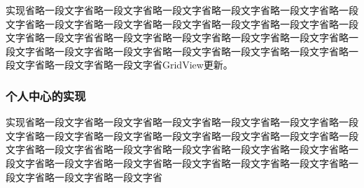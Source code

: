 		实现省略一段文字省略一段文字省略一段文字省略一段文字省略一段文字省略一段文字省略一段文字省略一段文字省略一段文字省略一段文字省略一段文字省略一段文字省略一段文字省省略一段文字省略一段文字省略一段文字省略一段文字省略一段文字省略一段文字省略一段文字省略一段文字省略一段文字省略一段文字省略一段文字省略一段文字省略一段文字省GridView更新。
		
		\subsubsection{个人中心的实现}
		
		实现省略一段文字省略一段文字省略一段文字省略一段文字省略一段文字省略一段文字省略一段文字省略一段文字省略一段文字省略一段文字省略一段文字省略一段文字省略一段文字省省略一段文字省略一段文字省略一段文字省略一段文字省略一段文字省略一段文字省略一段文字省略一段文字省略一段文字省略一段文字省略一段文字省略一段文字省略一段文字省

 \clearpage